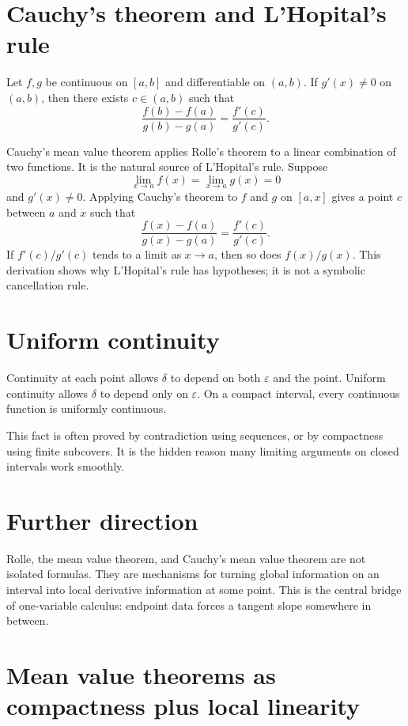 \section{Cauchy's theorem and L'Hopital's rule}

\begin{theorem}
Let \(f,g\) be continuous on \([a,b]\) and differentiable on \((a,b)\).  If \(g'(x)\ne0\) on \((a,b)\), then there exists \(c\in(a,b)\) such that
\[
  \frac{f(b)-f(a)}{g(b)-g(a)}=\frac{f'(c)}{g'(c)}.
\]
\end{theorem}


Cauchy's mean value theorem applies Rolle's theorem to a linear combination of two functions.  It is the natural source of L'Hopital's rule.  Suppose
\[
  \lim_{x\to a}f(x)=\lim_{x\to a}g(x)=0
\]
and \(g'(x)\ne0\).  Applying Cauchy's theorem to \(f\) and \(g\) on \([a,x]\) gives a point \(c\) between \(a\) and \(x\) such that
\[
  \frac{f(x)-f(a)}{g(x)-g(a)}=\frac{f'(c)}{g'(c)}.
\]
If \(f'(c)/g'(c)\) tends to a limit as \(x\to a\), then so does \(f(x)/g(x)\).  This derivation shows why L'Hopital's rule has hypotheses; it is not a symbolic cancellation rule.

\section{Uniform continuity}

Continuity at each point allows \(\delta\) to depend on both \(\varepsilon\) and the point.  Uniform continuity allows \(\delta\) to depend only on \(\varepsilon\).  On a compact interval, every continuous function is uniformly continuous.

This fact is often proved by contradiction using sequences, or by compactness using finite subcovers.  It is the hidden reason many limiting arguments on closed intervals work smoothly.

\section{Further direction}

Rolle, the mean value theorem, and Cauchy's mean value theorem are not isolated formulas.  They are mechanisms for turning global information on an interval into local derivative information at some point.  This is the central bridge of one-variable calculus: endpoint data forces a tangent slope somewhere in between.

\section{Mean value theorems as compactness plus local linearity}

